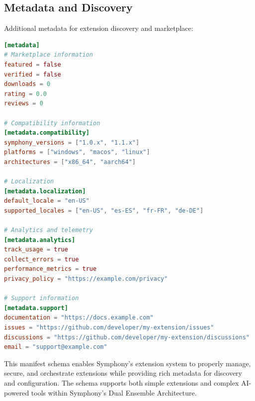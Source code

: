 \subsection*{Metadata and Discovery}

Additional metadata for extension discovery and marketplace:

\begin{lstlisting}[language=toml,caption={Metadata and Discovery}]
[metadata]
# Marketplace information
featured = false
verified = false
downloads = 0
rating = 0.0
reviews = 0

# Compatibility information
[metadata.compatibility]
symphony_versions = ["1.0.x", "1.1.x"]
platforms = ["windows", "macos", "linux"]
architectures = ["x86_64", "aarch64"]

# Localization
[metadata.localization]
default_locale = "en-US"
supported_locales = ["en-US", "es-ES", "fr-FR", "de-DE"]

# Analytics and telemetry
[metadata.analytics]
track_usage = true
collect_errors = true
performance_metrics = true
privacy_policy = "https://example.com/privacy"

# Support information
[metadata.support]
documentation = "https://docs.example.com"
issues = "https://github.com/developer/my-extension/issues"
discussions = "https://github.com/developer/my-extension/discussions"
email = "support@example.com"
\end{lstlisting}

This manifest schema enables Symphony's extension system to properly manage, secure, and orchestrate extensions while providing rich metadata for discovery and configuration. The schema supports both simple extensions and complex AI-powered tools within Symphony's Dual Ensemble Architecture.
